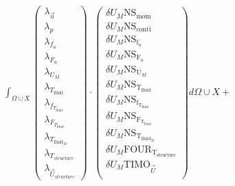 \documentclass[10pt]{article} %
\begin{document}
\begin{center}
	$\int_{\Omega \cup X}
	\begin{pmatrix}
		\lambda_{\vec{u}} \\ \lambda_p \\ \lambda_{f_u} \\ \lambda_{F_u} \\ \lambda_{U_M}\\ \lambda_{T_{\text{fluid}}} \\ \lambda_{f_{T_{\text{fluid}}}} \\ \lambda_{F_{T_{\text{fluid}}}} \\ \lambda_{T_{\text{fluid}_M}} \\ \lambda_{T_{structure}} \\ \lambda_{\vec{U}_{structure}}
	\end{pmatrix}
	\cdot
	\begin{pmatrix}
		\delta U_M \text{NS}_{\text{mom}} \\
		\delta U_M \text{NS}_{\text{conti}}\\
		\delta U_M \text{NS}_{\text{f}_u} \\
		\delta U_M \text{NS}_{\text{F}_u} \\
		\delta U_M \text{NS}_{\text{U}_M} \\
		\delta U_M \text{NS}_{\text{T}_{\text{fluid}}} \\
		\delta U_M \text{NS}_{\text{f}_{\text{T}_{\text{fluid}}}}\\
		\delta U_M \text{NS}_{\text{F}_{\text{T}_{\text{fluid}}}}\\
		\delta U_M \text{NS}_{\text{T}_{\text{fluid}_M}}\\
		\delta U_M \text{FOUR}_{\text{T}_{\text{structure}}}\\
		\delta U_M \text{TIMO}_{\vec{U}}\\
	\end{pmatrix}
	d\Omega \cup X + $\\


\end{center}
\end{document}
